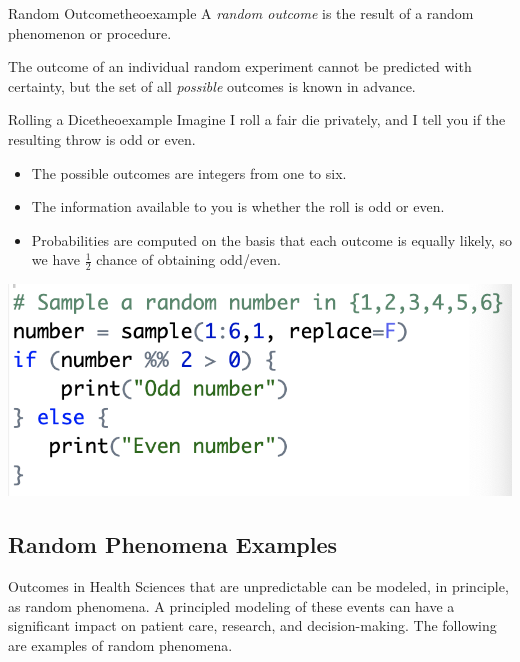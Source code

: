 \documentclass{tufte-handout}
\begin{document}
\begin{mydef}{Random Outcome}{theoexample}
A \textit{random outcome} is the result of a random phenomenon or procedure.
\end{mydef}
The outcome of an individual random experiment cannot be predicted with certainty, but
the set of all \textit{possible} outcomes is known in advance. 

\begin{mybox}{Rolling a Dice}{theoexample}
Imagine I roll a fair die privately, and I tell you if the resulting throw is odd or even.
\begin{itemize}
\item The possible outcomes are integers from one to six.
\item The information available to you is whether the roll is odd or even.
\item Probabilities are computed on the basis that each outcome is equally likely, so we have $\frac{1}{2}$ chance of obtaining odd/even.
\end{itemize}
\end{mybox}
 \begin{marginfigure}
\includegraphics{fig/code1.png}
\caption{R code implementation of the random experiment described in Example 1. Outcomes have equal probability (i.e., the dice is fair). }
\end{marginfigure}

\subsection{Random Phenomena Examples}

Outcomes in Health Sciences that are unpredictable can be modeled, in principle, as random phenomena. A principled modeling of these events
can have a significant impact on patient care, research, and decision-making. The following are examples of random phenomena.
\end{document}
